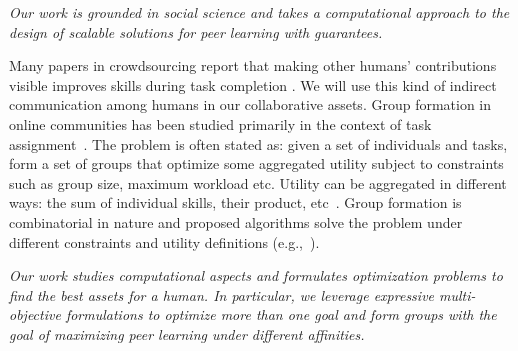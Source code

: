 \documentclass[11pt]{article}
\begin{document}
{\em Our work is grounded in social science and takes a computational approach to the design of scalable solutions for peer learning with guarantees.}

Many papers in crowdsourcing report that making other humans' contributions visible improves skills during task completion \cite{DKK+12,KKS13,KIM15,KMM+18,DKB19}. 
We will use this kind of indirect communication among humans in our collaborative assets. 
Group formation in online communities has been studied primarily in the context of task assignment~\cite{anagnostopoulos2010power, DBLP:conf/www/AnagnostopoulosBCGL12, DBLP:conf/kdd/LappasLT09, senjuti1, senjuti2}. The
problem is often stated as: given a set of individuals and tasks, form a set of groups that optimize some aggregated utility subject to
constraints such as group size, maximum workload etc. Utility can be aggregated in different
ways: the sum of individual skills, their product,
etc~\cite{DBLP:conf/www/AnagnostopoulosBCGL12}. Group formation is
combinatorial in nature and proposed algorithms solve
the problem under different constraints and utility definitions
(e.g.,~\cite{DBLP:conf/kdd/LappasLT09}).  

{\em Our work studies computational aspects and formulates optimization problems to find the best assets for a human. In particular, we leverage expressive multi-objective formulations to optimize more than one goal and form groups with the goal of maximizing peer learning under different
affinities.}
\end{document}
